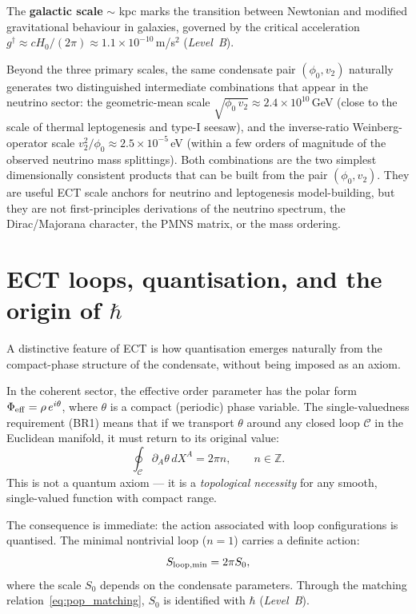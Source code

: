 \documentclass[11pt,a4paper]{article}
\begin{document}
The \textbf{galactic scale} $\sim$ kpc marks the transition between Newtonian and modified gravitational behaviour in galaxies, governed by the critical acceleration $g^\dagger \approx cH_0/(2\pi) \approx 1.1 \times 10^{-10}$\,m/s$^2$ (\emph{Level~B}).

Beyond the three primary scales, the same condensate pair $(\phi_0, v_2)$ naturally generates two distinguished intermediate combinations that appear in the neutrino sector: the geometric-mean scale $\sqrt{\phi_0\,v_2} \approx 2.4 \times 10^{10}$\,GeV (close to the scale of thermal leptogenesis and type-I seesaw), and the inverse-ratio Weinberg-operator scale $v_2^2/\phi_0 \approx 2.5 \times 10^{-5}$\,eV (within a few orders of magnitude of the observed neutrino mass splittings). Both combinations are the two simplest dimensionally consistent products that can be built from the pair $(\phi_0,v_2)$. They are useful ECT scale anchors for neutrino and leptogenesis model-building, but they are not first-principles derivations of the neutrino spectrum, the Dirac/Majorana character, the PMNS matrix, or the mass ordering.

\FloatBarrier

\section{ECT loops, quantisation, and the origin of $\hbar$}
\label{sec:pop_loops}

A distinctive feature of ECT is how quantisation emerges naturally from the compact-phase structure of the condensate, without being imposed as an axiom.

In the coherent sector, the effective order parameter has the polar form $\Phi_{\rm eff} = \rho\,e^{i\theta}$, where $\theta$ is a compact (periodic) phase variable. The single-valuedness requirement (BR1) means that if we transport $\theta$ around any closed loop $\mathcal{C}$ in the Euclidean manifold, it must return to its original value:
\begin{equation}
  \oint_{\mathcal{C}} \partial_A\theta\,dX^A = 2\pi n,
  \qquad n \in \mathbb{Z}.
  \label{eq:pop_winding}
\end{equation}
This is not a quantum axiom --- it is a \emph{topological necessity} for any smooth, single-valued function with compact range.

The consequence is immediate: the action associated with loop configurations is quantised. The minimal nontrivial loop ($n = 1$) carries a definite action:
\begin{equation}
  S_{\rm loop,min} = 2\pi S_0,
  \label{eq:pop_Sloop}
\end{equation}
where the scale $S_0$ depends on the condensate parameters. Through the matching relation~\eqref{eq:pop_matching}, $S_0$ is identified with $\hbar$ (\emph{Level~B}).
\end{document}

